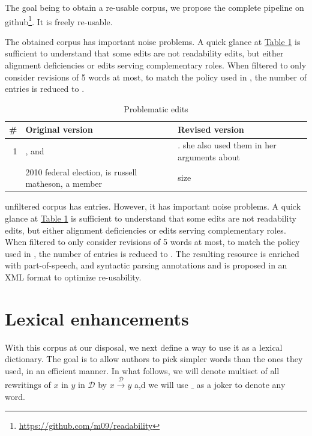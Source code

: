 \documentclass[a4paper, 11pt, onepage]{scrreprt}
\newcommand\tableref[1]{\hyperref[#1]{Table \ref*{#1}}}
\newcommand\maps[1]{\xrightarrow{\mathcal{#1}}}
\begin{document}
The goal being to obtain a re-usable corpus, we propose the complete
pipeline on
github\footnote{\url{https://github.com/m09/readability}}. It is
freely re-usable.

The obtained corpus has important noise problems. A quick glance at
\tableref{tab:problematic-edits} is sufficient to understand that some
edits are not readability edits, but either alignment deficiencies or
edits serving complementary roles. When filtered to only consider
revisions of 5 words at most, to match the policy used in
\cite{yatskar2010sake}, the number of entries is reduced to
.

\begin{table}[H]
  \centering
  \caption{Problematic edits}
  \begin{tabular}{rp{6cm}p{6cm}}
    \toprule
    \# & Original version & Revised version \\
    \midrule
    1 & , and & . she also used them in her arguments about \\
    \addlinespace
    2 & 2010 federal election, is russell matheson, a member & size\\
  \end{tabular}
  \label{tab:problematic-edits}
\end{table}

unfiltered corpus has  entries. However,
it has important noise problems. A quick glance at
\tableref{tab:problematic-edits} is sufficient to understand that some
edits are not readability edits, but either alignment deficiencies or
edits serving complementary roles. When filtered to only consider
revisions of 5 words at most, to match the policy used in
\cite{yatskar2010sake}, the number of entries is reduced to
.
The resulting resource is enriched with part-of-speech, and syntactic
parsing annotations and is proposed in an XML format to optimize
re-usability.

\section{Lexical enhancements}
\label{sec:lexical-enhancements}

With this corpus at our disposal, we next define a way to use it as a
lexical dictionary. The goal is to allow authors to pick simpler words
than the ones they used, in an efficient manner. In what follows, we
will denote multiset of all rewritings of $x$ in $y$ in $\mathcal{D}$
by $x \maps{D} y$ a,d we will use $\_$ as a joker to denote any word.
\end{document}
